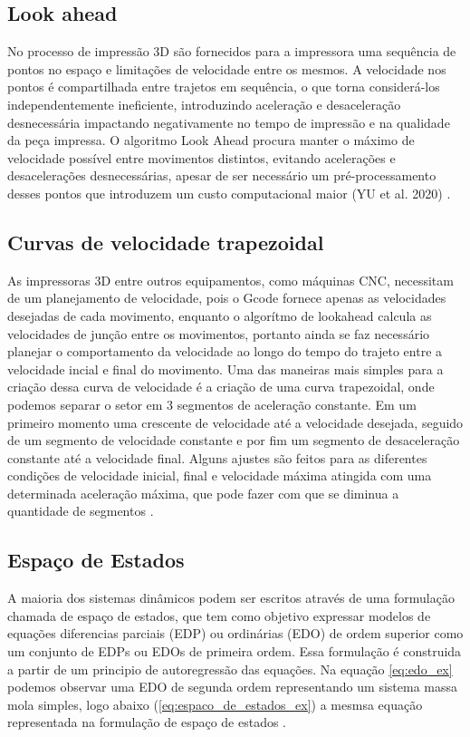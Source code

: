 \subsection{Look ahead}
No processo de impressão 3D são fornecidos para a impressora 
uma sequência de pontos no espaço e limitações de velocidade 
entre os mesmos. A velocidade nos pontos é compartilhada entre 
trajetos em sequência, o que torna considerá-los 
independentemente ineficiente, introduzindo aceleração e 
desaceleração desnecessária impactando negativamente no tempo 
de impressão e na qualidade da peça impressa.
O algoritmo Look Ahead procura manter o máximo de velocidade 
possível entre movimentos distintos, evitando acelerações e 
desacelerações desnecessárias, apesar de ser necessário um 
pré-processamento desses pontos que introduzem um custo 
computacional maior (YU et al. 2020) \cite{yu20, klipperkinematic}.

\subsection{Curvas de velocidade trapezoidal}
As impressoras 3D entre outros equipamentos, como máquinas CNC, necessitam
de um planejamento de velocidade, pois o Gcode fornece apenas as velocidades desejadas
de cada movimento, enquanto o algorítmo de lookahead calcula as velocidades
de junção entre os movimentos, portanto ainda se faz necessário planejar
o comportamento da velocidade ao longo do tempo do trajeto entre a velocidade incial
e final do movimento.
Uma das maneiras mais simples para a criação dessa curva de velocidade é
a criação de uma curva trapezoidal, onde podemos separar o setor em 3 segmentos
de aceleração constante. Em um primeiro momento uma crescente de velocidade até
a velocidade desejada, seguido de um segmento de velocidade constante e por fim
um segmento de desaceleração constante até a velocidade final.
Alguns ajustes são feitos para as diferentes condições de velocidade inicial, final e
velocidade máxima atingida com uma determinada aceleração máxima, que pode
fazer com que se diminua a quantidade de segmentos \cite{yu20,klipperkinematic}.

\subsection{Espaço de Estados}

A maioria dos sistemas dinâmicos podem ser escritos através de uma formulação
chamada de espaço de estados, que tem como objetivo expressar modelos 
de equações diferencias parciais (EDP) ou ordinárias (EDO) de ordem superior
como um conjunto de EDPs ou EDOs de primeira ordem.
Essa formulação é construida a partir de um principio de autoregressão
das equações. Na equação \ref{eq:edo_ex} podemos observar uma EDO de segunda ordem representando
um sistema massa mola simples,
logo abaixo (\ref{eq:espaco_de_estados_ex}) a mesmsa equação representada na formulação
de espaço de estados \cite{hamilton94}.

